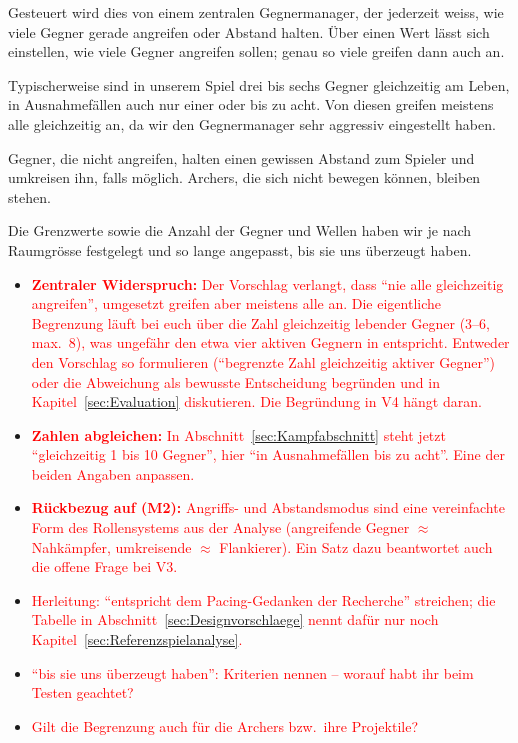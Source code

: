 \documentclass[../Main.tex]{subfiles}
\begin{document}
Gesteuert wird dies von einem zentralen Gegnermanager, der jederzeit weiss, wie viele Gegner gerade angreifen oder Abstand halten. Über einen Wert lässt sich einstellen, wie viele Gegner angreifen sollen; genau so viele greifen dann auch an.

Typischerweise sind in unserem Spiel drei bis sechs Gegner gleichzeitig am Leben, in Ausnahmefällen auch nur einer oder bis zu acht. Von diesen greifen meistens alle gleichzeitig an, da wir den Gegnermanager sehr aggressiv eingestellt haben.

Gegner, die nicht angreifen, halten einen gewissen Abstand zum Spieler und umkreisen ihn, falls möglich. Archers, die sich nicht bewegen können, bleiben stehen.

Die Grenzwerte sowie die Anzahl der Gegner und Wellen haben wir je nach Raumgrösse festgelegt und so lange angepasst, bis sie uns überzeugt haben.

\begin{itemize}[leftmargin=1.5cm]
    \item \textcolor{red}{\textbf{Zentraler Widerspruch:} Der Vorschlag verlangt, dass \enquote{nie alle gleichzeitig angreifen}, umgesetzt greifen aber meistens alle an. Die eigentliche Begrenzung läuft bei euch über die Zahl gleichzeitig lebender Gegner (3--6, max.\ 8), was ungefähr den etwa vier aktiven Gegnern in  entspricht. Entweder den Vorschlag so formulieren (\enquote{begrenzte Zahl gleichzeitig aktiver Gegner}) oder die Abweichung als bewusste Entscheidung begründen und in Kapitel~\ref{sec:Evaluation} diskutieren. Die Begründung in V4 hängt daran.}
    \item \textcolor{red}{\textbf{Zahlen abgleichen:} In Abschnitt~\ref{sec:Kampfabschnitt} steht jetzt \enquote{gleichzeitig 1 bis 10 Gegner}, hier \enquote{in Ausnahmefällen bis zu acht}. Eine der beiden Angaben anpassen.}
    \item \textcolor{red}{\textbf{Rückbezug auf  (M2):} Angriffs- und Abstandsmodus sind eine vereinfachte Form des Rollensystems aus der Analyse (angreifende Gegner $\approx$ Nahkämpfer, umkreisende $\approx$ Flankierer). Ein Satz dazu beantwortet auch die offene Frage bei V3.}
    \item \textcolor{red}{Herleitung: \enquote{entspricht dem Pacing-Gedanken der Recherche} streichen; die Tabelle in Abschnitt~\ref{sec:Designvorschlaege} nennt dafür nur noch Kapitel~\ref{sec:Referenzspielanalyse}.}
    \item \textcolor{red}{\enquote{bis sie uns überzeugt haben}: Kriterien nennen -- worauf habt ihr beim Testen geachtet?}
    \item \textcolor{red}{Gilt die Begrenzung auch für die Archers bzw.\ ihre Projektile?}
\end{itemize}
\end{document}
